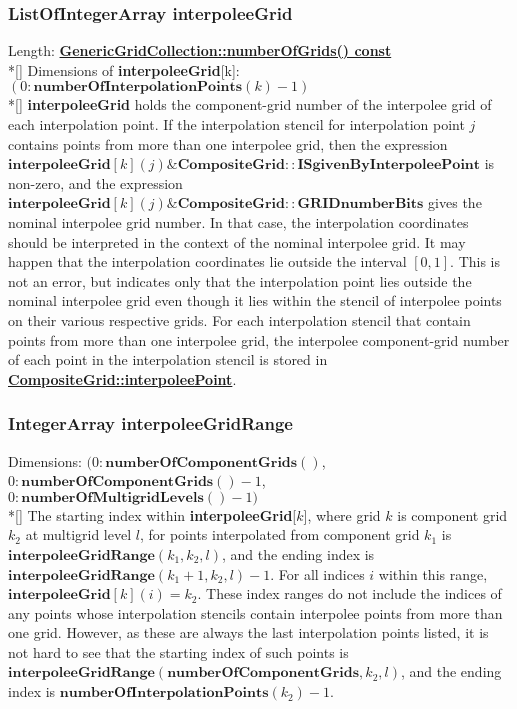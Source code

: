\documentclass{article}
\begin{document}
  \subsubsection{ListOfIntegerArray interpoleeGrid}
  \label{CompositeGrid::interpoleeGrid}
    Length: {\bf{}\hyperref{numberOfGrids()}{numberOfGrids() \rm(\S}{)}{GenericGridCollection::numberOfGrids() const}} \\*[\parskip]
    Dimensions of \textbf{interpoleeGrid}[k]: $(0\colon\textbf{numberOfInterpolationPoints}(k)-1)$ \\*[\parskip]
    \textbf{interpoleeGrid} holds the component-grid number of the interpolee grid of each interpolation point.  If the interpolation
    stencil for interpolation point $j$ contains points from more than one interpolee grid, then the expression
    $\textbf{interpoleeGrid}[k](j) \& \textbf{CompositeGrid}\colon\colon\textbf{ISgivenByInterpoleePoint}$ is non-zero, and the
    expression $\textbf{interpoleeGrid}[k](j)\&\textbf{CompositeGrid}\colon\colon\textbf{GRIDnumberBits}$ gives the
    nominal interpolee grid number.  In that case, the interpolation coordinates should be interpreted in the context of the nominal interpolee
    grid.  It may happen that the interpolation coordinates lie outside the interval $[0,1]$.  This is not an error, but indicates only that
    the interpolation point lies outside the nominal interpolee grid even though it lies within the stencil of interpolee points on their
    various respective grids.  For each interpolation stencil that contain points from more than one interpolee grid, the interpolee component-grid
    number of each point in the interpolation stencil is stored in
    {\bf{}\hyperref{interpoleePoint$[k]$}{interpoleePoint$[k]$ \rm(\S}{)}{CompositeGrid::interpoleePoint}}.

  \subsubsection{IntegerArray interpoleeGridRange}
  \label{CompositeGrid::interpoleeGridRange}
    Dimensions: $(0\colon\textbf{numberOfComponentGrids}()$, $0\colon\textbf{numberOfComponentGrids}()-1$, $0\colon\textbf{numberOfMultigridLevels}()-1)$ \\*[\parskip]
    The starting index within \textbf{interpoleeGrid}[$k$], where grid $k$ is component grid $k_2$ at multigrid level $l$, for points interpolated
    from component grid $k_1$ is $\textbf{interpoleeGridRange}(k_1,k_2,l)$, and the ending index is $\textbf{interpoleeGridRange}(k_1+1,k_2,l)-1$.
    For all indices $i$ within this range, $\textbf{interpoleeGrid}[k](i) = k_2$.
    These index ranges do not include the indices of any points whose interpolation stencils contain interpolee points from more than one grid.
    However, as these are always the last interpolation points listed, it is not hard to see that the starting index of such points is
    $\textbf{interpoleeGridRange}(\textbf{numberOfComponentGrids},k_2,l)$, and the ending index is $\textbf{numberOfInterpolationPoints}(k_2)-1$.
\end{document}
